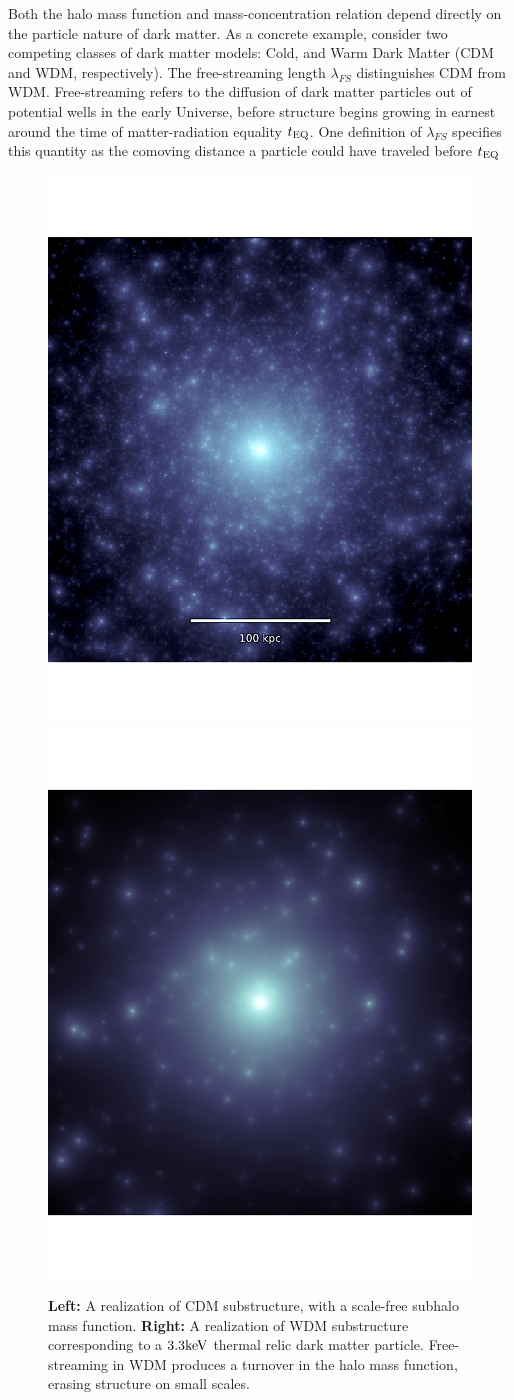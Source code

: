 Both the halo mass function and mass-concentration relation depend directly on the particle nature of dark matter. As a concrete example, consider two competing classes of dark matter models: Cold, and Warm Dark Matter (CDM and WDM, respectively). The free-streaming length $\lambda_{FS}$ distinguishes CDM from WDM. Free-streaming refers to the diffusion of dark matter particles out of potential wells in the early Universe, before structure begins growing in earnest around the time of matter-radiation equality $t_{\rm{EQ}}$. One definition of $\lambda_{FS}$ specifies this quantity as the comoving distance a particle could have traveled before $t_{\rm{EQ}}$ \cite{Schneider++12} 
\begin{figure}
	\centering
	\includegraphics[clip,trim=0cm 0cm 0cm
	0cm,width=.48\textwidth,keepaspectratio]{./figures_introduction/CDMscreenshot_edited.pdf}
	\includegraphics[clip,trim=0cm 0cm 0cm
	0cm,width=.48\textwidth,keepaspectratio]{./figures_introduction/WDMrealization_nobar.pdf}
	\caption{\label{fig:wdmrealization} {\bf{Left:}} A realization of CDM substructure, with a scale-free subhalo mass function. {\bf{Right:}} A realization of WDM substructure corresponding to a $3.3 \rm{keV}$ thermal relic dark matter particle. Free-streaming in WDM produces a turnover in the halo mass function, erasing structure on small scales.}
\end{figure}

